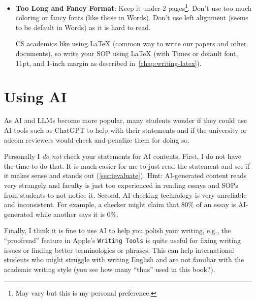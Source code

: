\documentclass[oneside,11pt]{book}
\begin{document}
\begin{itemize}
\item \textbf{Too Long and Fancy Format}: Keep it under 2 pages\footnote{May vary but this is my personal preference.}. Don't use too much coloring or fancy fonts (like those in Words). Don't use left alignment (seems to be default in Words) as it is hard to read.

CS academics like using \LaTeX{} (common way to write our papers and other documents), so write your SOP using \LaTeX{} (with Times or default font, 11pt, and 1-inch margin as described in~\autoref{chap:writing-latex}).
\end{itemize}

\section{Using AI}\label{sec:using-ai}

As AI and LLMs become more popular, many students wonder if they could use AI tools such as ChatGPT to help with their statements and if the university or adcom reviewers would check and penalize them for doing so.

Personally I \emph{do not} check your statements for AI contents. First, I do not have the time to do that.  It is much easier for me to just read the statement and see if it makes sense and stands out (\autoref{sec:ievaluate}). Hint: AI-generated content reads very strangely and faculty is just too experienced in reading essays and SOPs from students to not notice it.
Second, AI-checking technology is very unreliable and inconsistent. For example, a checker might claim that 80\% of an essay is AI-generated while another says it is 0\%.  

Finally, I think it is fine to use AI to help you polish your writing, e.g., the ``proofread'' feature in Apple's \texttt{Writing Tools} is quite useful for fixing writing issues or finding better terminologies or phrases. This can help international students who might struggle with writing English and are not familiar with the academic writing style (you see how many ``thus'' used in this book?). 


\end{document}
